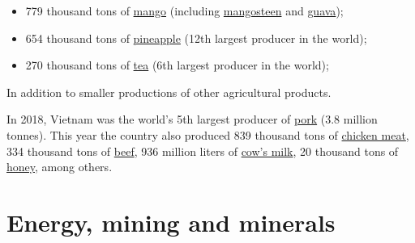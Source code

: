\documentclass[openany]{book}
\begin{document}
\begin{itemize}
    \item 779 thousand tons of \href{https://en.wikipedia.org/wiki/Mango}{mango} (including \href{https://en.wikipedia.org/wiki/Mangosteen}{mangosteen} and \href{https://en.wikipedia.org/wiki/Guava}{guava});
    \item 654 thousand tons of \href{https://en.wikipedia.org/wiki/Pineapple}{pineapple} (12th largest producer in the world);
    \item 270 thousand tons of \href{https://en.wikipedia.org/wiki/Tea}{tea} (6th largest producer in the world);
\end{itemize}

In addition to smaller productions of other agricultural products.\cite{67}

In 2018, Vietnam was the world's 5th largest producer of \href{https://en.wikipedia.org/wiki/Pork}{pork} (3.8 million tonnes). This year the country also produced 839 thousand tons of \href{https://en.wikipedia.org/wiki/Chicken_meat}{chicken meat}, 334 thousand tons of \href{https://en.wikipedia.org/wiki/Beef}{beef}, 936 million liters of \href{https://en.wikipedia.org/wiki/Cow%27s_milk}{cow's milk}, 20 thousand tons of \href{https://en.wikipedia.org/wiki/Honey}{honey}, among others.\cite{67}

\section{Energy, mining and minerals}
\end{document}

